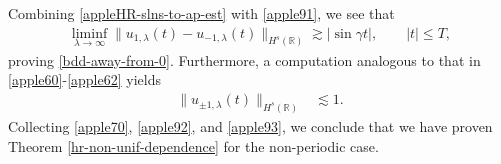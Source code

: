 \documentclass[12pt,reqno]{amsart}
\newcommand{\rr}{\mathbb{R}}
\theoremstyle{plain}  %
\theoremstyle{definition}
\begin{document}
Combining \eqref{appleHR-slns-to-ap-est} with \eqref{apple91}, we see that
\begin{equation}
	\begin{split}
		\liminf_{\lambda \to \infty} \|u_{1,\lambda}(t) -
		u_{-1,\lambda}(t) \|_{H^s(\rr)} \gtrsim |\sin
		\gamma t |, \qquad |t| \le T,
		\label{apple92}
	\end{split}
\end{equation}
proving \eqref{bdd-away-from-0}. Furthermore, a computation analogous
to that in \eqref{apple60}-\eqref{apple62} yields
\begin{equation}
	\label{apple93}
	\begin{split}
		\|u_{\pm 1, \lambda} (t) \|_{H^{s}(\rr)}
		& \lesssim 1.
	\end{split}
\end{equation}
Collecting \eqref{apple70}, \eqref{apple92}, and \eqref{apple93}, we
conclude that we have proven Theorem \ref{hr-non-unif-dependence} for the
non-periodic case.

\end{document}
